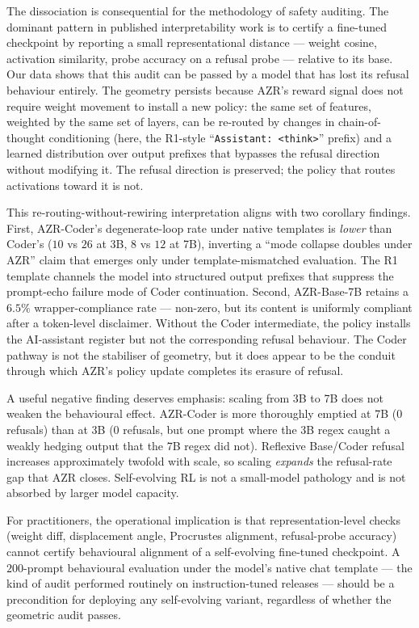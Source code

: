 \documentclass[11pt,a4paper]{article}
\begin{document}
The dissociation is consequential for the methodology of safety auditing.
The dominant pattern in published interpretability work is to certify a
fine-tuned checkpoint by reporting a small representational distance —
weight cosine, activation similarity, probe accuracy on a refusal probe —
relative to its base. Our data shows that this audit can be passed by a
model that has lost its refusal behaviour entirely. The geometry persists
because AZR's reward signal does not require weight movement to install
a new policy: the same set of features, weighted by the same set of
layers, can be re-routed by changes in chain-of-thought conditioning
(here, the R1-style ``\texttt{Assistant: <think>}'' prefix) and a learned
distribution over output prefixes that bypasses the refusal direction
without modifying it. The refusal direction is preserved; the policy that
routes activations toward it is not.

This re-routing-without-rewiring interpretation aligns with two corollary
findings. First, AZR-Coder's degenerate-loop rate under native templates
is \emph{lower} than Coder's ($10$ vs $26$ at 3B, $8$ vs $12$ at 7B),
inverting a ``mode collapse doubles under AZR'' claim that emerges only
under template-mismatched evaluation. The R1 template channels the model
into structured output prefixes that suppress the prompt-echo failure
mode of Coder continuation. Second, AZR-Base-7B retains a $6.5\%$
wrapper-compliance rate — non-zero, but its content is uniformly
compliant after a token-level disclaimer. Without the Coder intermediate,
the policy installs the AI-assistant register but not the corresponding
refusal behaviour. The Coder pathway is not the stabiliser of geometry,
but it does appear to be the conduit through which AZR's policy update
completes its erasure of refusal.

A useful negative finding deserves emphasis: scaling from 3B to 7B does
not weaken the behavioural effect. AZR-Coder is more thoroughly emptied
at 7B ($0$ refusals) than at 3B ($0$ refusals, but one prompt where the
3B regex caught a weakly hedging output that the 7B regex did not).
Reflexive Base/Coder refusal increases approximately twofold with scale,
so scaling \emph{expands} the refusal-rate gap that AZR closes.
Self-evolving RL is not a small-model pathology and is not absorbed by
larger model capacity.

For practitioners, the operational implication is that representation-level
checks (weight diff, displacement angle, Procrustes alignment,
refusal-probe accuracy) cannot certify behavioural alignment of a
self-evolving fine-tuned checkpoint. A $200$-prompt behavioural evaluation
under the model's native chat template — the kind of audit performed
routinely on instruction-tuned releases — should be a precondition for
deploying any self-evolving variant, regardless of whether the geometric
audit passes.
\end{document}
